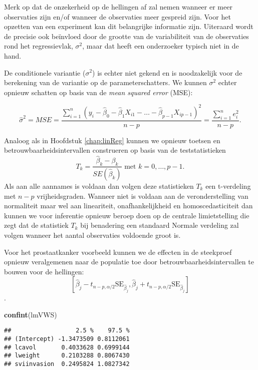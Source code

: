 \documentclass[12pt,dutch,coursenotes]{book}
\newenvironment{Shaded}{\begin{snugshade}}{\end{snugshade}}
\newcommand{\KeywordTok}[1]{\textcolor[rgb]{0.13,0.29,0.53}{\textbf{#1}}}
\newcommand{\NormalTok}[1]{#1}
\theoremstyle{definition}
\theoremstyle{definition}
\theoremstyle{definition}
\theoremstyle{remark}
\begin{document}
Merk op dat de onzekerheid op de hellingen af zal nemen wanneer er meer
observaties zijn en/of wanneer de observaties meer gespreid zijn. Voor
het opzetten van een experiment kan dit belangrijke informatie zijn.
Uiteraard wordt de precisie ook beïnvloed door de grootte van de
variabiliteit van de observaties rond het regressievlak, \(\sigma^2\),
maar dat heeft een onderzoeker typisch niet in de hand.

De conditionele variantie (\(\sigma^2\)) is echter niet gekend en is
noodzakelijk voor de berekening van de variantie op de
parameterschatters. We kunnen \(\sigma^2\) echter opnieuw schatten op
basis van de \emph{mean squared error} (MSE):

\[\hat\sigma^2=MSE=\frac{\sum\limits_{i=1}^n \left(y_i-\hat\beta_0-\hat\beta_1 X_{i1}-\ldots-\hat\beta_{p-1} X_{ip-1}\right)^2}{n-p}=\frac{\sum\limits_{i=1}^n e^2_i}{n-p}.\]

Analoog als in Hoofdstuk \ref{chap:linReg} kunnen we opnieuw toetsen en
betrouwbaarheidsintervallen construeren op basis van de
teststatistieken\\
\[T_k=\frac{\hat{\beta}_k-\beta_k}{SE(\hat{\beta}_k)} \text{ met } k=0, \ldots, p-1.\]
Als aan alle aannames is voldaan dan volgen deze statistieken \(T_k\)
een t-verdeling met \(n-p\) vrijheidsgraden. Wanneer niet is voldaan aan
de veronderstelling van normaliteit maar wel aan lineariteit,
onafhankelijkheid en homoscedasticiteit dan kunnen we voor inferentie
opnieuw beroep doen op de centrale limietstelling die zegt dat de
statistiek \(T_k\) bij benadering een standaard Normale verdeling zal
volgen wanneer het aantal observaties voldoende groot is.

Voor het prostaatkanker voorbeeld kunnen we de effecten in de steekproef
opnieuw veralgemenen naar de populatie toe door
betrouwbaarheidsintervallen te bouwen voor de hellingen:
\[[\hat\beta_j - t_{n-p,\alpha/2} \text{SE}_{\hat\beta_j},\hat\beta_j + t_{n-p,\alpha/2} \text{SE}_{\hat\beta_j}]\].

\begin{Shaded}
\begin{Highlighting}[]
\KeywordTok{confint}\NormalTok{(lmVWS)}
\end{Highlighting}
\end{Shaded}

\begin{verbatim}
##                  2.5 %    97.5 %
## (Intercept) -1.3473509 0.8112061
## lcavol       0.4033628 0.6999144
## lweight      0.2103288 0.8067430
## sviinvasion  0.2495824 1.0827342
\end{verbatim}
\end{document}
